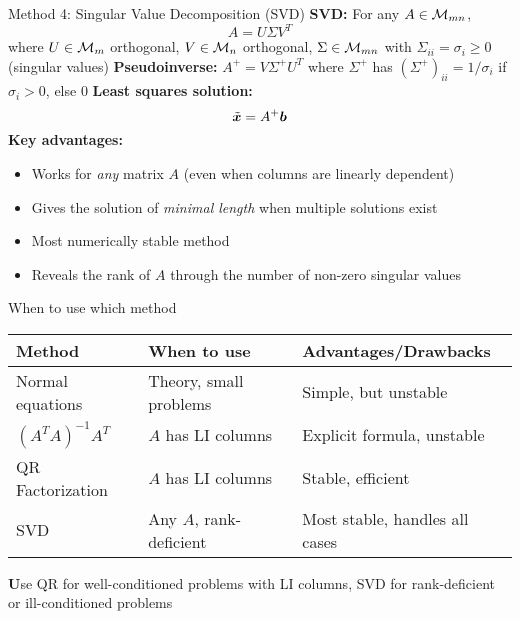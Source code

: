 \documentclass[aspectratio=169]{beamer}\usepackage[]{graphicx}\usepackage[]{xcolor}
\begin{document}
\begin{frame}{Method 4: Singular Value Decomposition (SVD)}
\textbf{SVD:} For any $A\in\mathcal{M}_{mn}$,
$$A = U\Sigma V^T$$
where $U\in\mathcal{M}_m$ orthogonal, $V\in\mathcal{M}_n$ orthogonal, $\Sigma\in\mathcal{M}_{mn}$ with $\Sigma_{ii} = \sigma_i \geq 0$ (singular values)
\vfill
\textbf{Pseudoinverse:} $A^+ = V\Sigma^+ U^T$ where $\Sigma^+$ has $(\Sigma^+)_{ii} = 1/\sigma_i$ if $\sigma_i > 0$, else $0$
\vfill
\textbf{Least squares solution:}
$$\tilde{\bm{x}} = A^+\bm{b}$$
\vfill
\textbf{Key advantages:}
\begin{itemize}
\item Works for \emph{any} matrix $A$ (even when columns are linearly dependent)
\item Gives the solution of \emph{minimal length} when multiple solutions exist
\item Most numerically stable method
\item Reveals the rank of $A$ through the number of non-zero singular values
\end{itemize}
\end{frame}

\begin{frame}{When to use which method}
\begin{center}
\begin{tabular}{|l|l|l|}
\hline
\textbf{Method} & \textbf{When to use} & \textbf{Advantages/Drawbacks} \\
\hline
Normal equations & Theory, small problems & Simple, but unstable \\
\hline
$(A^TA)^{-1}A^T$ & $A$ has LI columns & Explicit formula, unstable \\
\hline
QR Factorization & $A$ has LI columns & Stable, efficient \\
\hline
SVD & Any $A$, rank-deficient & Most stable, handles all cases \\
\hline
\end{tabular}
\end{center}
\vfill
\textbf Use QR for well-conditioned problems with LI columns, SVD for rank-deficient or ill-conditioned problems
\end{frame}


\end{document}
